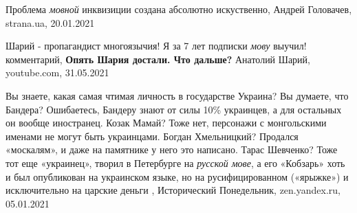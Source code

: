  
 
 
 
 
Проблема \emph{мовной} инквизиции создана абсолютно искуственно, Андрей
Головачев, strana.ua, 20.01.2021

Шарий - пропагандист многоязычия! Я за 7 лет подписки \emph{мову} выучил!
комментарий, \textbf{Опять Шария достали. Что дальше?} Анатолий Шарий, youtube.com, 31.05.2021

Вы знаете, какая самая чтимая личность в государстве Украина? Вы думаете, что
Бандера? Ошибаетесь, Бандеру знают от силы 10\% украинцев, а для остальных он
вообще иностранец. Козак Мамай? Тоже нет, персонажи с монгольскими именами не
могут быть украинцами. Богдан Хмельницкий? Продался «москалям», и даже на
памятнике у него это написано.  Тарас Шевченко? Тоже тот еще «украинец», творил
в Петербурге на \emph{русской мове}, а его «Кобзарь» хоть и был опубликован на
украинском языке, но на русифицированном («ярыжке») и исключительно на царские
деньги
,
Исторический Понедельник, zen.yandex.ru, 05.01.2021 

